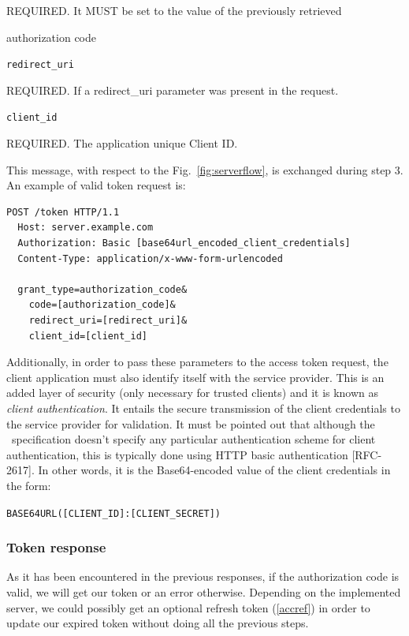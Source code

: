 \hspace{0.5cm}REQUIRED. It MUST be set to the value of the previously retrieved

\hspace{0.5cm}authorization code

\texttt{redirect\_uri}

\hspace{0.5cm}REQUIRED. If a redirect\_uri parameter was present in the request.

\texttt{client\_id}

\hspace{0.5cm}REQUIRED. The application unique Client ID.

\vspace{0.5cm}

\noindent This message, with respect to the Fig.~\ref{fig:serverflow}, is exchanged during step 3. An example of valid token request is:

\begin{lstlisting}[basicstyle=\ttfamily]
  POST /token HTTP/1.1
  Host: server.example.com
  Authorization: Basic [base64url_encoded_client_credentials]
  Content-Type: application/x-www-form-urlencoded

  grant_type=authorization_code&
    code=[authorization_code]&
    redirect_uri=[redirect_uri]&
    client_id=[client_id]
\end{lstlisting}

Additionally, in order to pass these parameters to the access token request, the client
application must also identify itself with the service provider. This is an added
layer of security (only necessary for trusted clients) and it is known as \textit{client
authentication}.
It entails the secure transmission of the client credentials to the service provider for validation. It must be pointed out that although the \oauth\ specification doesn't specify any particular authentication scheme for client authentication, this is typically done using HTTP basic authentication [RFC-2617].
In other words, it is the Base64-encoded value of the client credentials in
the form:

    \texttt{BASE64URL([CLIENT\_ID]:[CLIENT\_SECRET])}

\subsubsection{Token response}
As it has been encountered in the previous responses, if the authorization code is valid, we will get our token or an error otherwise. Depending on the implemented server, we could possibly get an optional refresh token (\ref{accref}) in order to update our expired token without doing all the previous steps.

